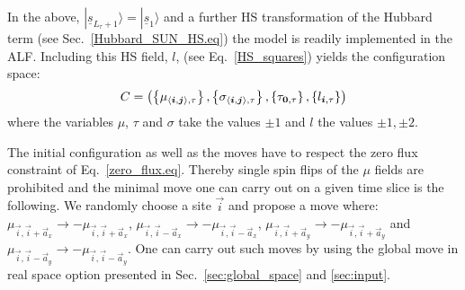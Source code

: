 In the above, $  | \underline{s}_{L_\tau+1}  \rangle  = | \underline{s}_{1}  \rangle   $ and a further  HS transformation of the Hubbard term (see Sec.~\ref{Hubbard_SUN_HS.eq})  the model is readily implemented in the ALF.    Including this HS field, $l$,  (see Eq.~\ref{HS_squares}) yields  the configuration space: 
\begin{equation}
	C = \left(  \left\{  \mu_{ \langle  \boldsymbol{i}, \boldsymbol{j} \rangle,\tau }  \right\},  \left\{  \sigma_{ \langle  \boldsymbol{i}, \boldsymbol{j} \rangle, \tau }  \right\},    \left\{ \tau_{\boldsymbol{0},\tau}    \right\},  \left\{ l_{\boldsymbol{i}, \tau}  \right\}  \right) 
\end{equation} 
where the variables $\mu$, $\tau$ and $\sigma$ take the values $\pm 1$  and $l$  the values $\pm1, \pm 2$. 

The initial configuration as well as the  moves have to respect the zero flux constraint of Eq.~\ref{zero_flux.eq}. Thereby single spin flips of the $\mu$ fields  are prohibited and the minimal move one can carry out on  a given time slice is the following. We randomly choose a site $\vec{i} $ and  propose a move where:
$ \mu_{\vec{i},\vec{i} +  \vec{a}_x} \rightarrow - \mu_{\vec{i},\vec{i} +  \vec{a}_x} $,  $ \mu_{\vec{i},\vec{i} -  \vec{a}_x} \rightarrow - \mu_{\vec{i},\vec{i} -  \vec{a}_x} $,
$ \mu_{\vec{i},\vec{i} +  \vec{a}_y} \rightarrow - \mu_{\vec{i},\vec{i} +  \vec{a}_y} $ and $ \mu_{\vec{i},\vec{i} -  \vec{a}_y} \rightarrow - \mu_{\vec{i},\vec{i} -  \vec{a}_y} $.  One can carry out such moves by using the global move in real space option presented in Sec.~\ref{sec:global_space} and \ref{sec:input}.



